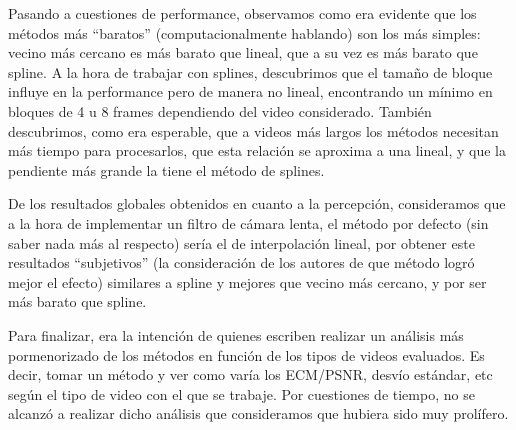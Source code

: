 \par Pasando a cuestiones de performance, observamos como era evidente que los
m\'etodos m\'as ``baratos'' (computacionalmente hablando) son los m\'as
simples: vecino m\'as cercano es m\'as barato que lineal, que a su vez es m\'as
barato que spline. A la hora de trabajar con splines, descubrimos que el tamaño de bloque influye en la performance pero de manera no lineal, encontrando un mínimo en bloques de 4 u 8 frames dependiendo del video considerado. También descubrimos, como era esperable, que a videos más largos los métodos necesitan más tiempo para procesarlos, que esta relación se aproxima a una lineal, y que la pendiente más grande la tiene el método de splines.

\par De los resultados globales obtenidos en cuanto a la
percepci\'on, consideramos que a la hora de implementar un filtro de c\'amara
lenta, el m\'etodo por defecto (sin saber nada m\'as al respecto) ser\'ia el de
interpolaci\'on lineal, por obtener este resultados ``subjetivos'' (la
consideraci\'on de los autores de que m\'etodo logr\'o mejor el efecto)
similares a spline y mejores que vecino m\'as cercano, y por ser m\'as barato
que spline.

\par Para finalizar, era la intenci\'on de quienes escriben realizar un
an\'alisis m\'as pormenorizado de los m\'etodos en funci\'on de los tipos de
videos evaluados. Es decir, tomar un m\'etodo y ver como var\'ia los ECM/PSNR,
desv\'io est\'andar, etc seg\'un el tipo de video con el que se trabaje. Por
cuestiones de tiempo, no se alcanz\'o a realizar dicho an\'alisis
que consideramos que hubiera sido muy prol\'ifero.
